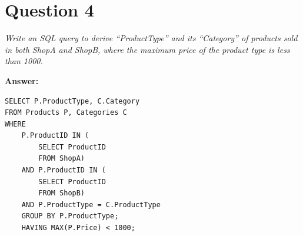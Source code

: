 \documentclass[a4paper,11pt]{article}
\begin{document}
\section*{Question 4}

\textit{Write an SQL query to derive ``ProductType'' and its ``Category'' of products sold in both ShopA and ShopB, where the maximum price of the product type is less than 1000.} 

\noindent
\textbf{Answer:} \\[-3em]

\begin{lstlisting}[label={list:first},caption=Query for ProductType and Category pair that has maximum price less than 1000.] 
SELECT P.ProductType, C.Category
FROM Products P, Categories C
WHERE 
    P.ProductID IN (
        SELECT ProductID
        FROM ShopA)
    AND P.ProductID IN (
        SELECT ProductID 
        FROM ShopB) 
    AND P.ProductType = C.ProductType
    GROUP BY P.ProductType;
    HAVING MAX(P.Price) < 1000;
\end{lstlisting}
\end{document}
